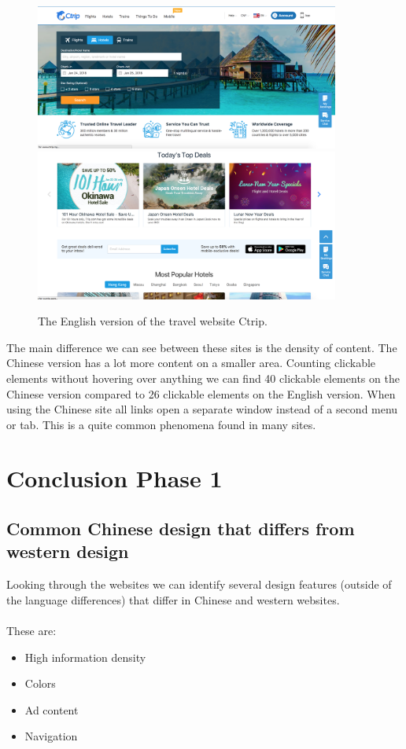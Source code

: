 \begin{figure}[h]
\centering
\includegraphics[width=100mm]{Images/ctrip_eng1}
\includegraphics[width=100mm]{Images/ctrip_eng2}
\decoRule
\caption[English version of Ctrip]{The English version of the travel website Ctrip.}
\label{fig:ctrip_english}
\end{figure}
 The main difference we can see between these sites is the density of content. The Chinese version has a lot more content on a smaller area. Counting clickable elements without hovering over anything we can find 40 clickable elements on the Chinese version compared to 26 clickable elements on the English version. When using the Chinese site all links open a separate window instead of a second menu or tab. This is a quite common phenomena found in many sites.
 
 
 
\newpage
 \section{Conclusion Phase 1}
 \subsection{Common Chinese design that differs from western design}
Looking through the websites we can identify several design features (outside of the language differences) that differ in Chinese and western websites. 
\\\\
These are:
 \begin{itemize}
 \item High information density
 \item Colors
 \item Ad content
 \item Navigation
 \end{itemize}
 
